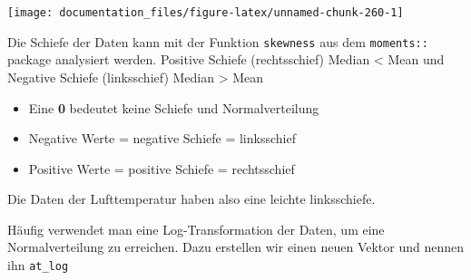 \documentclass[
]{article}
\newenvironment{Shaded}{\begin{snugshade}}{\end{snugshade}}
\newcommand{\AttributeTok}[1]{\textcolor[rgb]{0.77,0.63,0.00}{#1}}
\newcommand{\DocumentationTok}[1]{\textcolor[rgb]{0.56,0.35,0.01}{\textbf{\textit{#1}}}}
\newcommand{\FunctionTok}[1]{\textcolor[rgb]{0.00,0.00,0.00}{#1}}
\newcommand{\NormalTok}[1]{#1}
\newcommand{\SpecialCharTok}[1]{\textcolor[rgb]{0.00,0.00,0.00}{#1}}
\providecommand{\tightlist}{%
  \setlength{\itemsep}{0pt}\setlength{\parskip}{0pt}}
\begin{document}
\begin{center}\texttt{[image: documentation\_files/figure-latex/unnamed-chunk-260-1]} \end{center}

Die Schiefe der Daten kann mit der Funktion \texttt{skewness} aus dem \texttt{moments::} package analysiert werden. Positive Schiefe (rechtsschief) Median \textless{} Mean und Negative Schiefe (linksschief) Median \textgreater{} Mean

\begin{Shaded}
\end{Shaded}

\begin{itemize}
\tightlist
\item
  Eine \textbf{0} bedeutet keine Schiefe und Normalverteilung
\item
  Negative Werte = negative Schiefe = linksschief
\item
  Positive Werte = positive Schiefe = rechtsschief
\end{itemize}

Die Daten der Lufttemperatur haben also eine leichte linksschiefe.

Häufig verwendet man eine Log-Transformation der Daten, um eine Normalverteilung zu erreichen. Dazu erstellen wir einen neuen Vektor und nennen ihn \texttt{at\_log}
\end{document}
